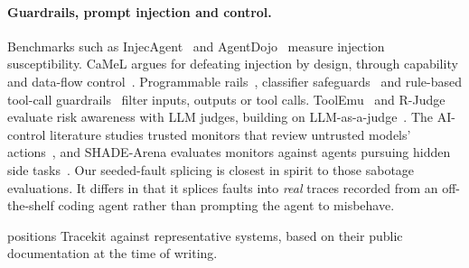 \documentclass[11pt]{article}
\begin{document}
\paragraph{Guardrails, prompt injection and control.} Benchmarks such as InjecAgent~\cite{zhan2024injecagent} and AgentDojo~\cite{debenedetti2024agentdojo} measure injection susceptibility. CaMeL argues for defeating injection by design, through capability and data-flow control~\cite{debenedetti2025camel}. Programmable rails~\cite{rebedea2023nemo}, classifier safeguards~\cite{inan2023llamaguard} and rule-based tool-call guardrails~\cite{invariant} filter inputs, outputs or tool calls. ToolEmu~\cite{ruan2024toolemu} and R-Judge~\cite{yuan2024rjudge} evaluate risk awareness with LLM judges, building on LLM-as-a-judge~\cite{zheng2023judging}. The AI-control literature studies trusted monitors that review untrusted models' actions~\cite{greenblatt2024control,bhatt2025ctrlz}, and SHADE-Arena evaluates monitors against agents pursuing hidden side tasks~\cite{kutasov2025shade}. Our seeded-fault splicing is closest in spirit to those sabotage evaluations. It differs in that it splices faults into \emph{real} traces recorded from an off-the-shelf coding agent rather than prompting the agent to misbehave.

 positions Tracekit against representative systems, based on their public documentation at the time of writing.

\begin{table}[t]
\centering\small
\caption{Capabilities by public documentation (Sept.~2026). \checkmark{} = documented; -- = not documented or out of scope. ``Self-report'' means capture of the model's stated reasoning or text; ``cross-check'' means automated comparison of intent, self-report and actions.}
\label{tab:comparison}
\setlength{\tabcolsep}{3pt}
\end{table}
\end{document}
